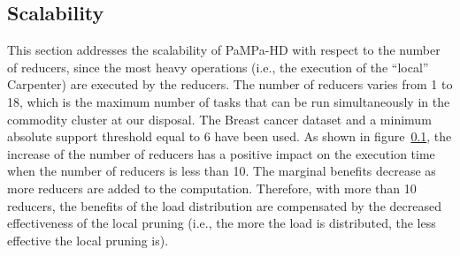 %
%
%
%




\subsection{Scalability}\label{scalability}
This section addresses the scalability of PaMPa-HD with respect to the
number of reducers, since the most heavy operations (i.e.,
the execution of the ``local'' Carpenter) are executed by the reducers.
The number of reducers varies from 1 to 18, 
which is the maximum number of tasks that can be run simultaneously 
in the commodity cluster at our disposal.
The Breast cancer dataset and a minimum absolute
support threshold equal to 6 have been used.
As shown in figure~\ref{scalability}, 
the increase of the number of reducers has
a positive impact on the execution time
when the number of reducers is less than 10.
The marginal benefits decrease as more reducers are added to the computation.
Therefore, with more than 10 reducers, the benefits of the load distribution
are compensated by the decreased effectiveness of the local pruning (i.e., the
more the load is distributed, the less effective the local pruning is).

%

